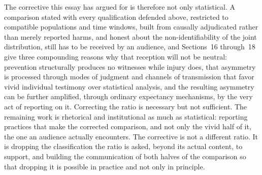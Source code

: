 \documentclass[11pt]{article}
\begin{document}
The corrective this essay has argued for is therefore not only statistical. A comparison stated with every qualification defended above, restricted to compatible populations and time windows, built from causally adjudicated rather than merely reported harms, and honest about the non-identifiability of the joint distribution, still has to be received by an audience, and Sections~16 through~18 give three compounding reasons why that reception will not be neutral: prevention structurally produces no witnesses while injury does, that asymmetry is processed through modes of judgment and channels of transmission that favor vivid individual testimony over statistical analysis, and the resulting asymmetry can be further amplified, through ordinary expectancy mechanisms, by the very act of reporting on it. Correcting the ratio is necessary but not sufficient. The remaining work is rhetorical and institutional as much as statistical: reporting practices that make the corrected comparison, and not only the vivid half of it, the one an audience actually encounters. The corrective is not a different ratio. It is dropping the classification the ratio is asked, beyond its actual content, to support, and building the communication of both halves of the comparison so that dropping it is possible in practice and not only in principle.
\end{document}
